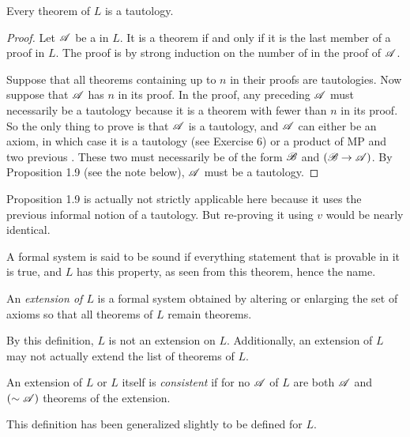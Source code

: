 \begin{proposition}
  Every theorem of \(L\) is a tautology.

  \begin{proof}
    Let \(\mathscr{A}\) be a \wf{} in \(L\). It is a theorem if and only if it is the last member of a proof in \(L\). The proof is by strong induction on the number of \wfs{} in the proof of \(\mathscr{A}\).

    Suppose that all theorems containing up to \(n\) \wfs{} in their proofs are tautologies. Now suppose that \(\mathscr{A}\) has \(n\) \wfs{} in its proof. In the proof, any \wf{} preceding \(\mathscr{A}\) must necessarily be a tautology because it is a theorem with fewer than \(n\) \wfs{} in its proof. So the only thing to prove is that \(\mathscr{A}\) is a tautology, and \(\mathscr{A}\) can either be an axiom, in which case it is a tautology (see Exercise 6) or a product of MP and two previous \wfs{}. These two \wfs{} must necessarily be of the form \(\mathscr{B}\) and \((\mathscr{B} \rightarrow \mathscr{A})\). By Proposition 1.9 (see the note below), \(\mathscr{A}\) must be a tautology.
  \end{proof}

  \note{} Proposition 1.9 is actually not strictly applicable here because it uses  the previous informal notion of a tautology. But re-proving it using \(v\) would be nearly identical.

  \note{} A formal system is said to be sound if everything statement that is provable in it is true, and \(L\) has this property, as seen from this theorem, hence the name.
\end{proposition}

\begin{definition}
  An \textit{extension of \(L\)} is a formal system obtained by altering or enlarging the set of axioms so that all theorems of \(L\) remain theorems.

  \note{} By this definition, \(L\) is not an extension on \(L\). Additionally, an extension of \(L\) may not actually extend the list of theorems of \(L\).
\end{definition}

\begin{definition}
  An extension of \(L\) or \(L\) itself is \textit{consistent} if for no \wf{} \(\mathscr{A}\) of \(L\) are both \(\mathscr{A}\) and \((\sim\mathscr{A})\) theorems of the extension.

  \note{} This definition has been generalized slightly to be defined for \(L\).
\end{definition}

